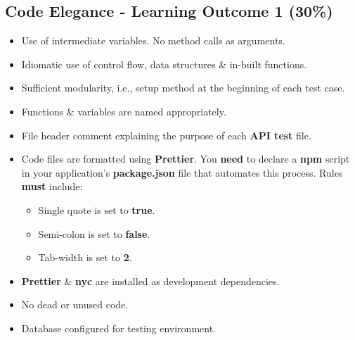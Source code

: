 \documentclass{article}
\begin{document}
\subsection*{Code Elegance - Learning Outcome 1 (30\%)}
\begin{itemize}
    \item Use of intermediate variables. No method calls as arguments.
    \item Idiomatic use of control flow, data structures \& in-built functions.
    \item Sufficient modularity, i.e., setup method at the beginning of each test case.
    \item Functions \& variables are named appropriately.
    \item File header comment explaining the purpose of each \textbf{API test} file.
    \item Code files are formatted using \textbf{Prettier}. You \textbf{need} to declare a \textbf{npm} script in your application's \textbf{package.json} file that automates this process. Rules \textbf{must} include:
          \begin{itemize}
            \item Single quote is set to \textbf{true}.
            \item Semi-colon is set to \textbf{false}.
            \item Tab-width is set to \textbf{2}.
          \end{itemize}
    \item \textbf{Prettier} \& \textbf{nyc} are installed as development dependencies.
    \item No dead or unused code.
    \item Database configured for testing environment.
\end{itemize}
\end{document}
